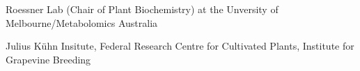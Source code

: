 {%
	}
{%
	Roessner Lab (Chair of Plant Biochemistry) at the Unversity of Melbourne/Metabolomics Australia
}
{%
}

{%
}
{%
	Julius K\"uhn Insitute, Federal Research Centre for Cultivated Plants, Institute for Grapevine Breeding
}
{%
}
